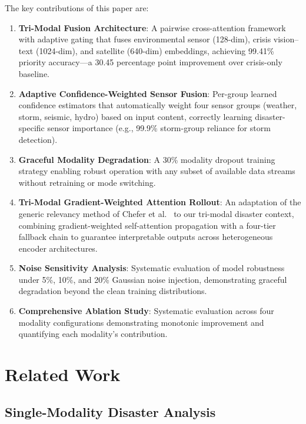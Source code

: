 \documentclass[journal]{IEEEtran}
\begin{document}
The key contributions of this paper are:

\begin{enumerate}
    \item \textbf{Tri-Modal Fusion Architecture}: A pairwise cross-attention framework with adaptive gating that fuses environmental sensor (128-dim), crisis vision--text (1024-dim), and satellite (640-dim) embeddings, achieving 99.41\% priority accuracy---a 30.45 percentage point improvement over crisis-only baseline.

    \item \textbf{Adaptive Confidence-Weighted Sensor Fusion}: Per-group learned confidence estimators that automatically weight four sensor groups (weather, storm, seismic, hydro) based on input content, correctly learning disaster-specific sensor importance (e.g., 99.9\% storm-group reliance for storm detection).

    \item \textbf{Graceful Modality Degradation}: A 30\% modality dropout training strategy enabling robust operation with any subset of available data streams without retraining or mode switching.

    \item \textbf{Tri-Modal Gradient-Weighted Attention Rollout}: An adaptation of the generic relevancy method of Chefer et al.~\cite{chefer2021transformer} to our tri-modal disaster context, combining gradient-weighted self-attention propagation with a four-tier fallback chain to guarantee interpretable outputs across heterogeneous encoder architectures.

    \item \textbf{Noise Sensitivity Analysis}: Systematic evaluation of model robustness under 5\%, 10\%, and 20\% Gaussian noise injection, demonstrating graceful degradation beyond the clean training distributions.

    \item \textbf{Comprehensive Ablation Study}: Systematic evaluation across four modality configurations demonstrating monotonic improvement and quantifying each modality's contribution.
\end{enumerate}

\section{Related Work}

\subsection{Single-Modality Disaster Analysis}
\end{document}
